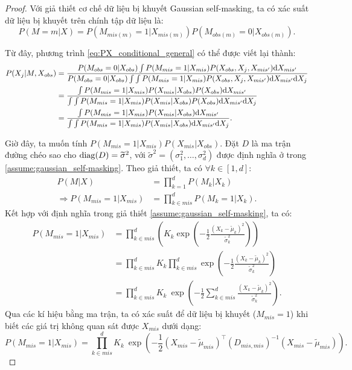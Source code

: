 \begin{proof}
    Với giả thiết cơ chế dữ liệu bị khuyết Gaussian self-masking, ta có xác suất dữ liệu bị khuyết trên chính tập dữ liệu là:
    \begin{equation*}
        P(M=m | X) = P(M_{mis(m)}=1 | X_{mis(m)}) P(M_{obs(m)}=0 | X_{obs(m)}).
    \end{equation*}

    Từ đây, phương trình \eqref{eq:PX_conditional_general} có thể được viết lại thành:    
    \begin{align}
        P(X_j | M, X_{obs}) &= \dfrac{ P(M_{obs}=0 | X_{obs}) \int P(M_{mis}=1 | X_{mis}) P(X_{obs}, X_j, X_{mis'}) \mathrm{d} X_{mis'}}
        {P(M_{obs}=0 | X_{obs}) \int \int P(M_{mis}=1 | X_{mis}) P(X_{obs}, X_j, X_{mis'}) \mathrm{d} X_{mis'} \mathrm{d} X_j} \notag \\
        &= \dfrac{\int P(M_{mis}=1 | X_{mis}) P(X_{mis} | X_{obs}) P(X_{obs}) \mathrm{d} X_{mis'}}
        {\int \int P(M_{mis}=1 | X_{mis}) P(X_{mis} | X_{obs}) P(X_{obs}) \mathrm{d} X_{mis'} \mathrm{d} X_j} \notag \\
        &= \dfrac{\int P(M_{mis}=1 | X_{mis}) P(X_{mis} | X_{obs}) \mathrm{d} X_{mis'}}
        {\int \int P(M_{mis}=1 | X_{mis}) P(X_{mis} | X_{obs}) \mathrm{d} X_{mis'} \mathrm{d} X_j}.\label{eq:PX_conditional_gaussian}
    \end{align}

    Giờ đây, ta muốn tính $P(M_{mis}=1 | X_{mis}) P(X_{mis} | X_{obs})$. 
    Đặt $D$ là ma trận đường chéo sao cho $\operatorname{diag}(D) = \widetilde{\sigma}^2$, với $\widetilde{\sigma}^2 = (\sigma_1^2, \dots, \sigma_d^2)$ được định nghĩa ở trong \ref{assume:gaussian_self-masking}. 
    Theo giả thiết, ta có $\forall k \in [1,d]$:
    \begin{align*}
        P(M|X) &= \prod_{k=1}^d P(M_k|X_k) \\
        \Rightarrow P(M_{mis}=1 | X_{mis}) &= \prod_{k\in mis}^d P(M_k = 1|X_k).
    \end{align*}
    Kết hợp với định nghĩa trong giả thiết \ref{assume:gaussian_self-masking}, ta có:
    \begin{align*}
        P(M_{mis}=1 | X_{mis}) &= \prod_{k\in mis}^d \left( K_{k} \exp\left( -\frac{1}{2} \frac{(X_{k} - \widetilde{\mu}_{k})^{2}}{\widetilde{\sigma}_{k}^{2}} \right) \right) \\
        &= \prod_{k\in mis}^d K_{k} \prod_{k\in mis}^d \exp\left( -\frac{1}{2} \frac{(X_{k} - \widetilde{\mu}_{k})^{2}}{\widetilde{\sigma}_{k}^{2}} \right) \\
        &= \prod_{k\in mis}^d K_{k} \  \exp\left( -\frac{1}{2} \sum_{k\in mis}^d \frac{(X_{k} - \widetilde{\mu}_{k})^{2}}{\widetilde{\sigma}_{k}^{2}} \right).
    \end{align*}
    Qua các kí hiệu bằng ma trận, ta có xác suất để dữ liệu bị khuyết ($M_{mis} = 1$) khi biết các giá trị không quan sát được $X_{mis}$ dưới dạng:
    \begin{equation}\label{eq:masking_probability}
        P(M_{mis}=1 | X_{mis}) = \prod_{k \in mis}^{d} K_{k} 
        \ \exp\left(-\frac{1}{2}(X_{mis}-\widetilde{\mu}_{mis})^{\top}(D_{mis,mis})^{-1}(X_{mis}-\widetilde{\mu}_{mis})\right).
    \end{equation}


\end{proof}
